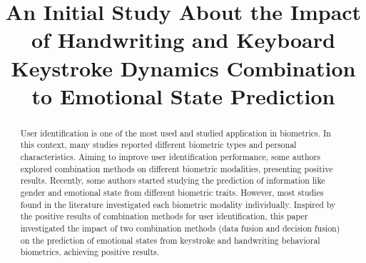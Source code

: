 \documentclass[conference]{IEEEtran}
\begin{document}
\title{An Initial Study About the Impact of Handwriting and Keyboard Keystroke Dynamics Combination to Emotional State Prediction\\
}


\maketitle

\begin{abstract}
User identification is one of the most used and studied application in biometrics. In this context, many studies reported different biometric types and personal characteristics. Aiming to improve user identification performance, some authors explored combination methods on different biometric modalities, presenting positive results. Recently, some authors started studying the prediction of information like gender and emotional state from different biometric traits. However, most studies found in the literature investigated each biometric modality individually. Inspired by the positive results of combination methods for user identification, this paper investigated the impact of two combination methods (data fusion and decision fusion) on the prediction of emotional states from keystroke and handwriting behavioral biometrics, achieving positive results.
\end{abstract}
\end{document}
